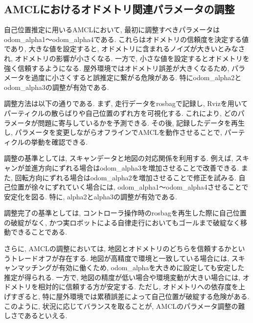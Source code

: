 \subsection{AMCLにおけるオドメトリ関連パラメータの調整}
自己位置推定に用いるAMCLにおいて, 最初に調整すべきパラメータはodom\_alpha1〜odom\_alpha4である. 
これらはオドメトリの信頼度を決定する値であり, 大きな値を設定すると, オドメトリに含まれるノイズが大きいとみなされ, オドメトリの影響が小さくなる. 
一方で, 小さな値を設定するとオドメトリを強く信頼するようになる. 屋外環境ではオドメトリ誤差が大きくなるため, パラメータを過度に小さくすると誤推定に繋がる危険がある. 
特にodom\_alpha2とodom\_alpha3の調整が有効である. 

調整方法は以下の通りである. まず, 走行データをrosbagで記録し, Rvizを用いてパーティクルの散らばりや自己位置のずれ方を可視化する. 
これにより, どのパラメータが問題に寄与しているかを予測できる. その後, 記録したデータを再生し, パラメータを変更しながらオフラインでAMCLを動作させることで, パーティクルの挙動を確認できる. 

調整の基準としては, スキャンデータと地図の対応関係を利用する. 例えば, スキャンが並進方向にずれる場合はodom\_alpha3を増加させることで改善できる. 
また, 回転方向にずれる場合はodom\_alpha2を増加させることで修正を試みる. 
自己位置が徐々にずれていく場合には, odom\_alpha1〜odom\_alpha4させることで安定化を図る. 
特に, alpha2とalpha3の調整が有効である. 

調整完了の基準としては, コントローラ操作時のrosbagを再生した際に自己位置の破綻がなく, かつ実ロボットによる自律走行においてもゴールまで破綻なく移動できることである. 

さらに, AMCLの調整においては, 地図とオドメトリのどちらを信頼するかというトレードオフが存在する. 
地図が高精度で環境と一致している場合には, スキャンマッチングが有効に働くため, odom\_alphaを大きめに設定しても安定した推定が得られる. 
一方で, 地図の精度が低い場合や環境変動が大きい場合には, オドメトリを相対的に信頼する方が安定する. 
ただし, オドメトリへの依存度を上げすぎると, 特に屋外環境では累積誤差によって自己位置が破綻する危険がある. 
このように, 状況に応じてバランスを取ることが, AMCLのパラメータ調整の難しさであるといえる. 

